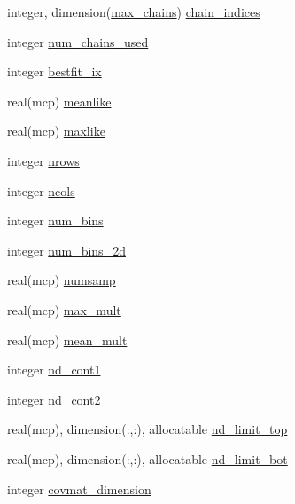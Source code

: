 \begin{DoxyCompactItemize}
\item 
integer, dimension(\mbox{\hyperlink{namespacemcsamples_a204c829ca43df2c6d41335156e6786ee}{max\+\_\+chains}}) \mbox{\hyperlink{namespacemcsamples_a196c1e189b163a496c0da2fcc96bf1f4}{chain\+\_\+indices}}
\item 
integer \mbox{\hyperlink{namespacemcsamples_a19f7c9315f7bf1a0fdcc248d0e9b9757}{num\+\_\+chains\+\_\+used}}
\item 
integer \mbox{\hyperlink{namespacemcsamples_ab3c722f8f5dd4ef38228bf41b333bf36}{bestfit\+\_\+ix}}
\item 
real(mcp) \mbox{\hyperlink{namespacemcsamples_ad9b26e8c7b01068cd5e285b2710ffff9}{meanlike}}
\item 
real(mcp) \mbox{\hyperlink{namespacemcsamples_a084bb79be779410b498f439e52a95c5e}{maxlike}}
\item 
integer \mbox{\hyperlink{namespacemcsamples_a3bf0377c41ca6723a2a682fdec7c7cba}{nrows}}
\item 
integer \mbox{\hyperlink{namespacemcsamples_a9c7a895a8bbc32cc9ec5a4e647f93842}{ncols}}
\item 
integer \mbox{\hyperlink{namespacemcsamples_a5b2ac0e6e68dd652c494d1b7bd789f96}{num\+\_\+bins}}
\item 
integer \mbox{\hyperlink{namespacemcsamples_a2adeb191d79be31ecfbaafc674ada8d1}{num\+\_\+bins\+\_\+2d}}
\item 
real(mcp) \mbox{\hyperlink{namespacemcsamples_a1c72401a481311c1c4b5b4d7c0b4b1d8}{numsamp}}
\item 
real(mcp) \mbox{\hyperlink{namespacemcsamples_a65308a62158ea3cd86ad4582d51e8cfe}{max\+\_\+mult}}
\item 
real(mcp) \mbox{\hyperlink{namespacemcsamples_a1ccd58a9a808001ffe645de8327594a2}{mean\+\_\+mult}}
\item 
integer \mbox{\hyperlink{namespacemcsamples_a76ea49efc6873b3f02d34f24ce452d5b}{nd\+\_\+cont1}}
\item 
integer \mbox{\hyperlink{namespacemcsamples_a42ec49d9a1202d3d9f840a5ae8a62420}{nd\+\_\+cont2}}
\item 
real(mcp), dimension(\+:,\+:), allocatable \mbox{\hyperlink{namespacemcsamples_a381886fbfe1702b96dbe899d11a79daa}{nd\+\_\+limit\+\_\+top}}
\item 
real(mcp), dimension(\+:,\+:), allocatable \mbox{\hyperlink{namespacemcsamples_af6035de97e3096d7ba8ee9ac9a2d8e1b}{nd\+\_\+limit\+\_\+bot}}
\item 
integer \mbox{\hyperlink{namespacemcsamples_aee5291f542c82e3b053eea9aa4a22eef}{covmat\+\_\+dimension}}

\end{DoxyCompactItemize}
